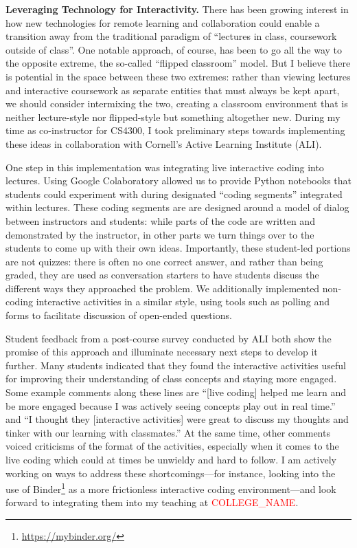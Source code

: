\documentclass[11pt,letterpaper]{article}
\renewcommand{\section}[1]{\vspace{0.25\baselineskip}\noindent\textbf{#1.}}
\newcommand{\schoolname}{\textcolor{red}{COLLEGE\_NAME}\xspace} %
\begin{document}
\section{Leveraging Technology for Interactivity}
There has been growing interest in how new technologies for remote learning and collaboration could enable a transition away from the traditional paradigm of ``lectures in class, coursework outside of class''.
One notable approach, of course, has been to go all the way to the opposite extreme, the so-called ``flipped classroom'' model.
But I believe there is potential in the space between these two extremes: rather than viewing lectures and interactive coursework as separate entities that must always be kept apart, we should consider intermixing the two, creating a classroom environment that is neither lecture-style nor flipped-style but something altogether new.
During my time as co-instructor for CS4300, I took preliminary steps towards implementing these ideas in collaboration with Cornell's Active Learning Institute (ALI).

One step in this implementation was integrating live interactive coding into lectures.
Using Google Colaboratory allowed us to provide Python notebooks that students could experiment with during designated ``coding segments'' integrated within lectures.
These coding segments are are designed around a model of dialog between instructors and students: while parts of the code are written and demonstrated by the instructor, in other parts we turn things over to the students to come up with their own ideas.
Importantly, these student-led portions are not quizzes: there is often no one correct answer, and rather than being graded, they are used as conversation starters to have students discuss the different ways they approached the problem.
We additionally implemented non-coding interactive activities in a similar style, using tools such as polling and forms to facilitate discussion of open-ended questions.

Student feedback from a post-course survey conducted by ALI both show the promise of this approach and illuminate necessary next steps to develop it further.
Many students indicated that they found the interactive activities useful for improving their understanding of class concepts and staying more engaged.
Some example comments along these lines are ``[live coding] helped me learn and be more engaged because I was actively seeing concepts play out in real time.'' and ``I thought they [interactive activities] were great to discuss my thoughts and tinker with our learning with classmates.''
At the same time, other comments voiced criticisms of the format of the activities, especially when it comes to the live coding which could at times be unwieldy and hard to follow.
I am actively working on ways to address these shortcomings---for instance, looking into the use of Binder\footnote{\url{https://mybinder.org/}} as a more frictionless interactive coding environment---and look forward to integrating them into my teaching at \schoolname.
\end{document}
